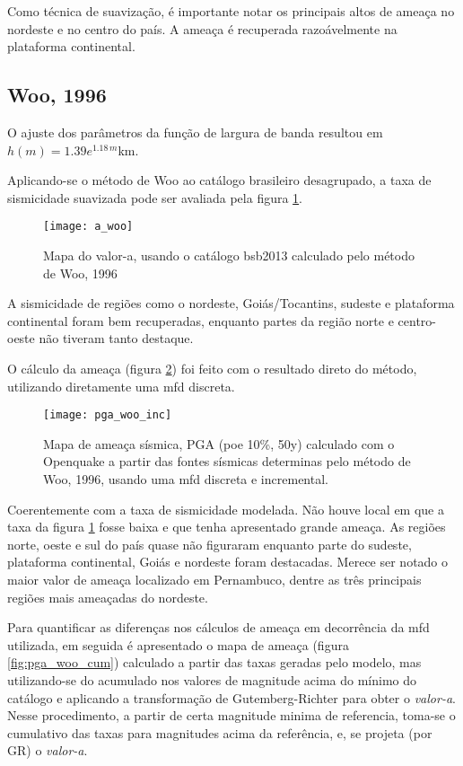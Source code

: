 Como técnica de suavização, é importante notar os principais altos de ameaça no nordeste e no centro do país.
A ameaça é recuperada razoávelmente na plataforma continental.

\subsection{Woo, 1996}
\label{sec:woo_resultados}

O ajuste dos parâmetros da função de largura de banda resultou em $h(m)=1.39e^{1.18\,m}$km.

Aplicando-se o método de Woo ao catálogo brasileiro desagrupado, a taxa de sismicidade suavizada 
pode ser avaliada pela figura \ref{fig:a_woo}.

\begin{figure}[H]
  \centering
  \texttt{[image: a\_woo]} 
  \caption{Mapa do valor-a, usando o catálogo \gls{bsb2013} calculado pelo método de Woo, 1996 }
  \label{fig:a_woo} 
\end{figure}

A sismicidade de regiões como o nordeste, Goiás/Tocantins, sudeste e plataforma continental 
foram bem recuperadas, enquanto partes da região norte e centro-oeste não tiveram tanto destaque. 

O cálculo da ameaça (figura \ref{fig:pga_woo_inc}) foi feito com o resultado direto do método, utilizando
diretamente uma \gls{mfd} discreta.
\begin{figure}[H]
  \centering
  \texttt{[image: pga\_woo\_inc]} 
  \caption{Mapa de ameaça sísmica, PGA (poe 10\%, 50y) 
  		   calculado com o Openquake a partir das fontes sísmicas
  		   determinas pelo método de Woo, 1996, usando uma \gls{mfd}
  		   discreta e incremental.
  }
  \label{fig:pga_woo_inc} 
\end{figure}

Coerentemente com a taxa de sismicidade modelada. Não houve local em que a taxa
da figura \ref{fig:a_woo} fosse baixa e que tenha apresentado grande ameaça.
As regiões norte, oeste e sul do país quase não figuraram 
enquanto parte do sudeste, plataforma continental, Goiás e nordeste foram
destacadas. Merece ser notado o maior valor de ameaça localizado em Pernambuco, dentre as três principais regiões mais ameaçadas do nordeste.

Para quantificar as diferenças nos cálculos de ameaça em decorrência da \gls{mfd} utilizada, em seguida é apresentado o
mapa de ameaça (figura \ref{fig:pga_woo_cum}) calculado a partir das taxas geradas pelo modelo, mas utilizando-se do
acumulado nos valores de magnitude acima do mínimo do catálogo e aplicando a transformação de Gutemberg-Richter 
para obter o \emph{valor-a}. Nesse procedimento, a partir de certa magnitude minima de referencia, toma-se o cumulativo
das taxas para magnitudes acima da referência, e, se projeta (por \gls{GR}) o \emph{valor-a}.

